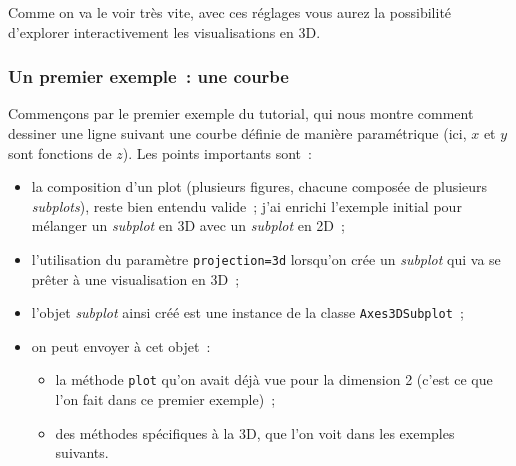     Comme on va le voir très vite, avec ces réglages vous aurez la
possibilité d'explorer interactivement les visualisations en 3D.

    \hypertarget{un-premier-exemple-une-courbe}{%
\subsubsection{Un premier exemple~: une
courbe}\label{un-premier-exemple-une-courbe}}

    Commençons par le premier exemple du tutorial, qui nous montre comment
dessiner une ligne suivant une courbe définie de manière paramétrique
(ici, \(x\) et \(y\) sont fonctions de \(z\)). Les points importants
sont~:

\begin{itemize}
\tightlist
\item
  la composition d'un plot (plusieurs figures, chacune composée de
  plusieurs \emph{subplots}), reste bien entendu valide~; j'ai enrichi
  l'exemple initial pour mélanger un \emph{subplot} en 3D avec un
  \emph{subplot} en 2D~;
\item
  l'utilisation du paramètre
  \texttt{projection=\textquotesingle{}3d\textquotesingle{}} lorsqu'on
  crée un \emph{subplot} qui va se prêter à une visualisation en 3D~;
\item
  l'objet \emph{subplot} ainsi créé est une instance de la classe
  \texttt{Axes3DSubplot}~;
\item
  on peut envoyer à cet objet~:

  \begin{itemize}
  \tightlist
  \item
    la méthode \texttt{plot} qu'on avait déjà vue pour la dimension 2
    (c'est ce que l'on fait dans ce premier exemple)~;
  \item
    des méthodes spécifiques à la 3D, que l'on voit dans les exemples
    suivants.
  \end{itemize}
\end{itemize}

